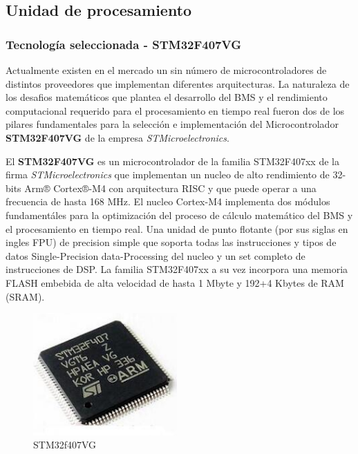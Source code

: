 \documentclass[10pt,a4paper]{article}
\begin{document}
\begin{itemize}
\subsection{Unidad de procesamiento}

\subsubsection{Tecnología seleccionada - STM32F407VG}

Actualmente existen en el mercado un sin número de microcontroladores de
distintos proveedores que implementan diferentes arquitecturas. La naturaleza de
los desafios matemáticos que plantea el desarrollo del \acrshort{BMS} y el
rendimiento computacional requerido para el procesamiento en tiempo real fueron
dos de los pilares fundamentales para la selección e implementación del
Microcontrolador \textbf{STM32F407VG} de la empresa \emph{STMicroelectronics}. 

El \textbf{STM32F407VG} es un microcontrolador de la familia STM32F407xx de la
firma \emph{STMicroelectronics} que implementan un nucleo de alto rendimiento de
32-bits Arm® Cortex®-M4 con arquitectura \acrshort{RISC} y que puede operar a
una frecuencia de hasta 168 MHz. El nucleo Cortex-M4 implementa dos módulos
fundamentáles para la optimización del proceso de cálculo matemático del
\acrshort{BMS} y el procesamiento en tiempo real. Una unidad de punto flotante
(por sus siglas en ingles \acrfull{FPU}) de precision simple que soporta todas
las instrucciones y tipos de datos Single-Precision data-Processing del nucleo
y un set completo de instrucciones de \acrshort{DSP}. La familia STM32F407xx a
su vez incorpora una memoria FLASH embebida de alta velocidad de hasta 1 Mbyte y
192+4 Kbytes de RAM (\acrfull{SRAM}).

\begin{figure}
    \includegraphics[width=5.5cm]{STM32F407VG.png}
    \caption{STM32f407VG}
    \label{fig:stm32f407vg}                                                            
\end{figure}                                                                 


\end{itemize}
\end{document}
